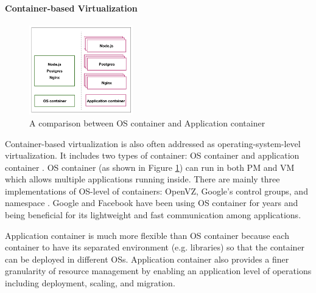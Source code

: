 
\paragraph{Container-based Virtualization} 

\begin{figure}
	\centering
	\includegraphics[width=0.4\textwidth]{pics/container_OS_APP.png}
	\caption{A comparison between OS container and Application container \cite{Piraghaj:2017vi}}
	\label{fig:comparison_container}
\end{figure}

Container-based virtualization is also often addressed as operating-system-level virtualization. It includes two types of container: OS container and application container \cite{Piraghaj:2017vi}. OS container (as shown in Figure \ref{fig:comparison_container}) can run in both PM and VM which allows multiple applications running inside. There are mainly three implementations of OS-level of containers: OpenVZ, Google's control groups, and namespace \cite{Rosen:2013wt}. Google and Facebook have been using OS container for years and being beneficial for its lightweight and fast communication among applications.

 Application container is much more flexible than OS container because each container to have its separated environment (e.g. libraries) so that the container can be deployed in different OSs. Application container also provides a finer granularity of resource management by enabling an application level of operations including deployment, scaling, and migration.  

